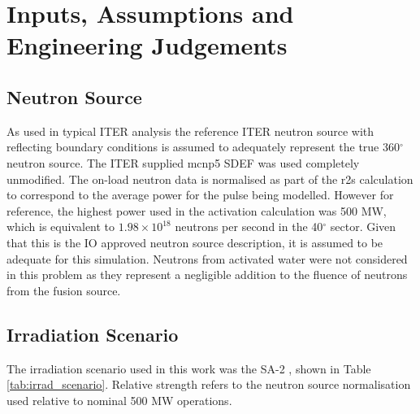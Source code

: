 \documentclass[12pt]{article}
\begin{document}
\clearpage
\newpage
\section{Inputs, Assumptions and Engineering Judgements}

\subsection{Neutron Source}
As used in typical ITER analysis the reference ITER neutron source 
\cite{iter_n_src} with
reflecting boundary conditions is assumed to adequately represent the
true 360$^{\circ}$ neutron source. The ITER supplied \gls{mcnp5} SDEF was used
completely unmodified. The on-load neutron data is normalised as part of the 
\gls{r2s} calculation to correspond to the 
average power for the pulse being modelled. However for reference,
the highest power used in the activation calculation was 500 MW, which is
equivalent to $1.98 \times 10^{18}$ neutrons per second in the 40$^{\circ}$
sector. Given that this is the IO approved neutron source description, it is
assumed to be adequate for this simulation.  Neutrons from activated water
were not considered in this problem as they represent a negligible addition
to the fluence of neutrons from the fusion source.

\subsection{Irradiation Scenario}
The irradiation scenario used in this work was the SA-2 \cite{sa2_irradiation}, 
shown in Table \ref{tab:irrad_scenario}. Relative strength refers to the 
neutron source normalisation used relative to nominal 500 MW operations.
\end{document}
